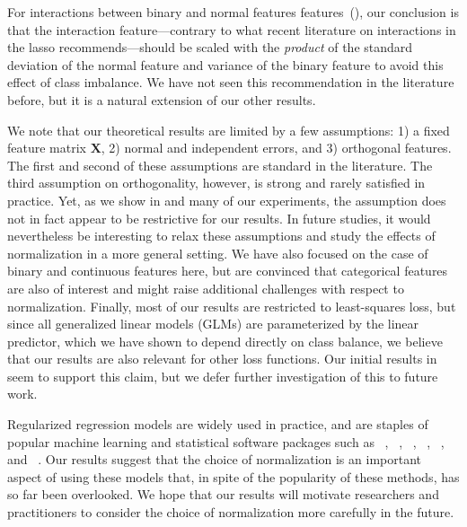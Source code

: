 For interactions between binary and normal features
features~(), our conclusion is that the interaction
feature---contrary to what recent literature on interactions in the lasso
recommends---should be scaled with the \emph{product} of the standard deviation of the
normal feature and variance of the binary feature to avoid this effect of class imbalance.
We have not seen this recommendation in the literature before, but it is a natural
extension of our other results.

We note that our theoretical results are limited by a few assumptions: 1) a fixed feature
matrix \(\bm{X}\), 2) normal and independent errors, and 3) orthogonal features. The first
and second of these assumptions are standard in the literature. The third assumption on
orthogonality, however, is strong and rarely satisfied in practice. Yet, as we show in
 and many of our experiments, the assumption does not in
fact appear to be restrictive for our results. In future studies, it would nevertheless be
interesting to relax these assumptions and study the effects of normalization in a more
general setting. We have also focused on the case of binary and continuous features here,
but are convinced that categorical features are also of interest and might raise additional
challenges with respect to normalization. Finally, most of our results are restricted to
least-squares loss, but since all generalized linear models (GLMs) are parameterized by the
linear predictor, which we have shown to depend directly on class balance, we believe that
our results are also relevant for other loss functions. Our initial results in
 seem to support this claim, but we defer further
investigation of this to future work.

Regularized regression models are widely used in practice, and are staples of popular
machine learning and statistical software packages such as
~\citep{friedman2010}, ~\citep{pedregosa2011},
~\citep{curtin2023}, ~\citep{bertrand2022},
~\citep{fan2008a}, and ~\citep{themathworksinc.2022}. Our
results suggest that the choice of normalization is an important aspect of using these
models that, in spite of the popularity of these methods, has so far been overlooked. We
hope that our results will motivate researchers and practitioners to consider the choice of
normalization more carefully in the future.
